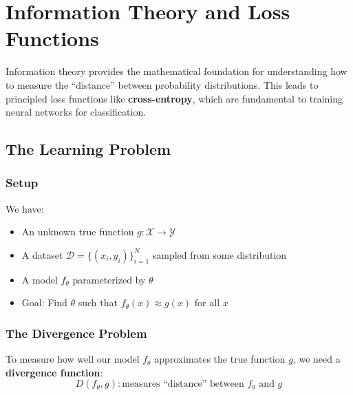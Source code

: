 
\chapter{Information Theory and Loss Functions}
\label{ch:information_theory}

\begin{keyconcept}
Information theory provides the mathematical foundation for understanding how to measure the ``distance'' between probability distributions. This leads to principled loss functions like \textbf{cross-entropy}, which are fundamental to training neural networks for classification.
\end{keyconcept}

\section{The Learning Problem}

\subsection{Setup}

We have:
\begin{itemize}
    \item An unknown true function $g: \mathcal{X} \to \mathcal{Y}$
    \item A dataset $\mathcal{D} = \{(x_i, y_i)\}_{i=1}^N$ sampled from some distribution
    \item A model $f_\theta$ parameterized by $\theta$
    \item Goal: Find $\theta$ such that $f_\theta(x) \approx g(x)$ for all $x$
\end{itemize}

\subsection{The Divergence Problem}

To measure how well our model $f_\theta$ approximates the true function $g$, we need a \textbf{divergence function}:
\[
D(f_\theta, g): \text{measures ``distance'' between } f_\theta \text{ and } g
\]

